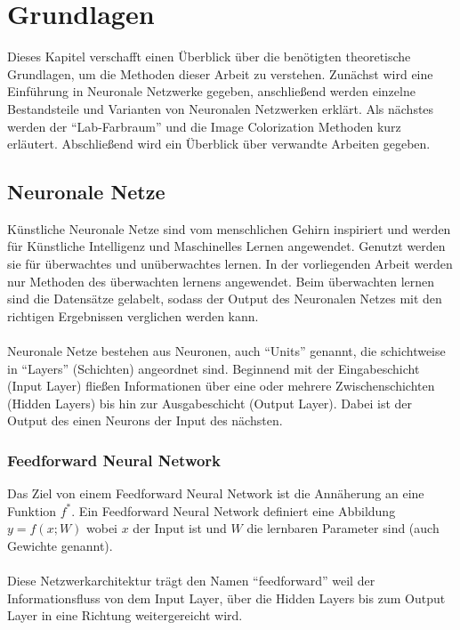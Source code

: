 \chapter{Grundlagen}
Dieses Kapitel verschafft einen Überblick über die benötigten theoretische Grundlagen, um die Methoden dieser Arbeit zu verstehen.
Zunächst wird eine Einführung in Neuronale Netzwerke gegeben, anschließend werden
einzelne Bestandsteile und Varianten von Neuronalen Netzwerken erklärt.
Als nächstes werden der ``Lab-Farbraum'' und die Image Colorization Methoden kurz erläutert. Abschließend wird ein Überblick über verwandte Arbeiten gegeben.

\section{Neuronale Netze}
Künstliche Neuronale Netze sind vom menschlichen Gehirn inspiriert und werden für Künstliche Intelligenz und Maschinelles Lernen
angewendet. Genutzt werden sie für überwachtes und unüberwachtes lernen. In der vorliegenden Arbeit werden nur Methoden des überwachten
lernens angewendet. Beim überwachten lernen sind die Datensätze gelabelt, sodass der Output des Neuronalen Netzes mit den richtigen Ergebnissen
verglichen werden kann.
\\
\\
Neuronale Netze bestehen aus Neuronen, auch ``Units'' genannt, die schichtweise in ``Layers'' (Schichten) angeordnet sind.
Beginnend mit der Eingabeschicht (Input \gls{Layer}) fließen Informationen über eine oder mehrere Zwischenschichten (Hidden \gls{Layer}s) bis hin zur
Ausgabeschicht (Output \gls{Layer}). Dabei ist der Output des einen Neurons der Input des nächsten. \cite{neuronale-netze-aufbau}

\subsection{Feedforward Neural Network}
Das Ziel von einem Feedforward Neural Network ist die Annäherung an eine Funktion $ f^* $. Ein Feedforward Neural Network definiert
eine Abbildung $ y = f(x;W) $ wobei $ x $ der Input ist und $ W $ die lernbaren Parameter sind (auch Gewichte genannt).
\cite[164-223]{Goodfellow-et-al-2016}
\\
\\
Diese Netzwerkarchitektur trägt den Namen ``feedforward'' weil der Informationsfluss von dem Input \gls{Layer},
über die Hidden Layers bis zum Output \gls{Layer} in eine Richtung weitergereicht wird.

